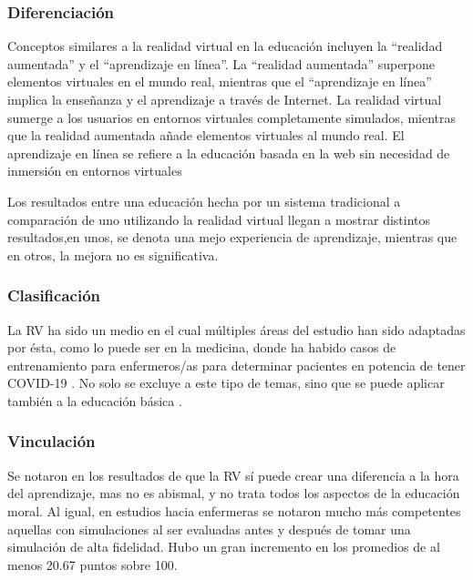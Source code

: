 \subsubsection{Diferenciación}

Conceptos similares a la realidad virtual en la educación incluyen la “realidad aumentada” y el “aprendizaje en línea”. La “realidad aumentada” superpone elementos virtuales en el mundo real, mientras que el “aprendizaje en línea” implica la enseñanza y el aprendizaje a través de Internet. La realidad virtual sumerge a los usuarios en entornos virtuales completamente simulados, mientras que la realidad aumentada añade elementos virtuales al mundo real. El aprendizaje en línea se refiere a la educación basada en la web sin necesidad de inmersión en entornos virtuales \parencite{garcia2020, LOWELL2023100017}

Los resultados entre una educaci\'on hecha por un sistema tradicional a comparaci{\'o}n de uno utilizando la realidad virtual llegan a mostrar distintos resultados,en unos, se denota una mejo experiencia de aprendizaje, mientras que en otros, la mejora no es significativa. \parencite{palma2020realidad, SHIM2023100010, GUERRERO2022100002}

\subsubsection{Clasificación}

La RV ha sido un medio en el cual múltiples áreas del estudio han sido adaptadas por \'esta, como lo puede ser en la medicina, donde ha habido casos de entrenamiento para enfermeros/as para determinar pacientes en potencia de tener COVID-19 \parencite{GUERRERO2022100002}. No solo se excluye a este tipo de temas, sino que se puede aplicar tambi{\'e}n a la educaci{\'o}n b{\'a}sica \parencite{marin2022realidad}.

\subsubsection{Vinculación}

Se notaron en los resultados de \textcite{SHIM2023100010} que la RV s\'i puede crear una diferencia a la hora del aprendizaje, mas no es abismal, y no trata todos los aspectos de la educación moral. Al igual, en estudios hacia enfermeras se notaron mucho m\'as competentes aquellas con simulaciones al ser evaluadas antes y después de tomar una simulación de alta fidelidad. Hubo un gran incremento en los promedios de al menos 20.67 puntos sobre 100. \parencite{GUERRERO2022100002}

